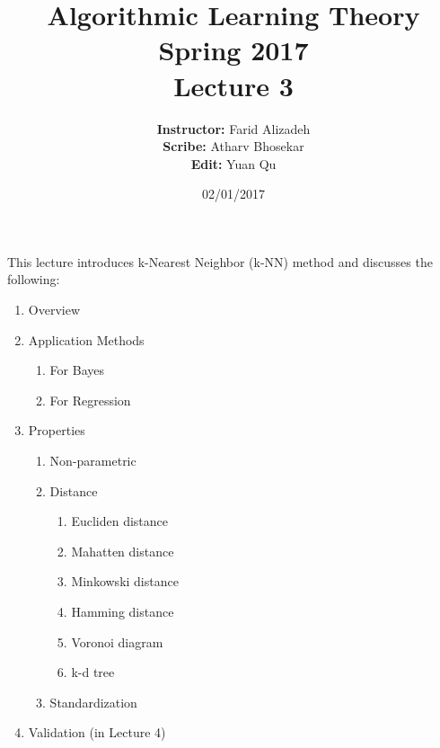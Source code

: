 \documentclass{article}
\title{ 
    Algorithmic Learning Theory\\
    Spring 2017\\
    Lecture 3
}
\author{
    {\bf Instructor:} Farid Alizadeh\\
    {\bf Scribe:} Atharv Bhosekar\\
    {\bf Edit:} Yuan Qu\\
}
\date{02/01/2017}
\begin{document}
\pagestyle{fancy}



\maketitle

\medskip

This lecture introduces k-Nearest Neighbor (k-NN) method and discusses the following:  


\begin{enumerate}
    \item Overview
    \item Application Methods
        \begin{enumerate}
            \item For Bayes
            \item For Regression
        \end{enumerate}
    \item Properties
        \begin{enumerate}
            \item Non-parametric
            \item Distance
                \begin{enumerate}
                    \item Eucliden distance
                    \item Mahatten distance
                    \item Minkowski distance
                    \item Hamming distance
                    \item Voronoi diagram
                    \item k-d tree
                \end{enumerate}
            \item Standardization
        \end{enumerate}
    \item Validation (in Lecture 4)
\end{enumerate}      
\end{document}
